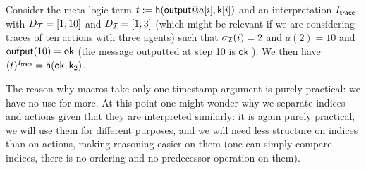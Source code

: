 \begin{example}
  Consider the meta-logic term $t := \mathsf{h}(\mout@a[i],\mathsf{k}[i])$
  and an interpretation $I_{\textsf{trace}}$ with $D_{\mathcal{T}} = [1;10]$ and $D_{\mathcal{I}} = [1;3]$
  (which might be relevant if we are considering traces of ten actions
  with three agents) such that $\sigma_{\mathcal{I}}(i)=2$ and $\hat{a}(2)=10$
  and $\hat{\textsf{output}}(10)=\mathsf{ok}$ (the message outputted at step 10
  is $\mathsf{ok}$ ).
  We then have $(t)^{I_{\textsf{trace}}} = \mathsf{h}(\mathsf{ok},\mathsf{k}_2)$.
\end{example}

The reason why macros take only one timestamp argument is purely practical:
we have no use for more. At this point one might wonder why we separate
indices and actions given that they are interpreted similarly: it is again
purely practical, we will use them for different purposes, and we will need
less structure on indices than on actions, making reasoning easier on them
(one can simply compare indices, there is no ordering and no predecessor
operation on them).


